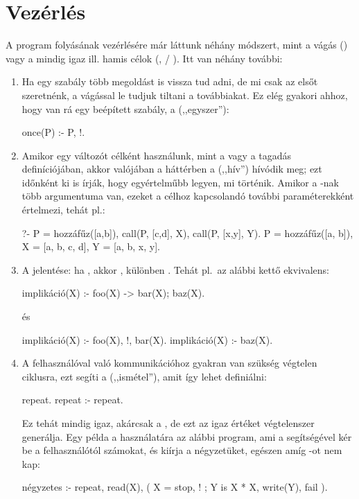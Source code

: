 \section{Vezérlés}
A program folyásának vezérlésére már láttunk néhány
módszert, mint a vágás (\pr{!}) vagy a mindig igaz
ill. hamis célok (,  /
). Itt van néhány további:
\begin{enumerate}
\item Ha egy szabály több megoldást is vissza tud
  adni, de mi csak az elsőt szeretnénk, a vágással
  le tudjuk tiltani a továbbiakat. Ez elég gyakori
  ahhoz, hogy van rá egy beépített szabály, a
   (,,egyszer''):
\begin{program}
once(P) :- P, !.
\end{program}
\item Amikor egy  változót célként használunk,
  mint a  vagy a tagadás definíciójában,
  akkor valójában a háttérben a 
  (,,hív'') hívódik meg; ezt időnként ki is írják,
  hogy egyértelműbb legyen, mi történik. Amikor a
  -nak több argumentuma van, ezeket a
  célhoz kapcsolandó további paraméterekként
  értelmezi, tehát pl.:
\begin{query}
?- P = hozzáfűz([a,b]),
   call(P, [c,d], X),
   call(P, [x,y], Y).
P = hozzáfűz([a, b]),
X = [a, b, c, d],
Y = [a, b, x, y].
\end{query}
\item A  jelentése: ha , akkor
  , különben . Tehát pl.~az alábbi kettő
  ekvivalens:
\index{\pr{->}}
\begin{program}
implikáció(X) :- foo(X) -> bar(X); baz(X).
\end{program}   
és
\begin{program}
implikáció(X) :- foo(X), !, bar(X).
implikáció(X) :- baz(X).
\end{program}
\item A felhasználóval való kommunikációhoz gyakran
  van szükség végtelen ciklusra, ezt segíti a
   (,,ismétel''), amit így lehet
  definiálni:
\begin{program}  
repeat.
repeat :- repeat.
\end{program}
Ez tehát mindig igaz, akárcsak a , de ezt
az igaz értéket végtelenszer generálja. Egy példa a
használatára az alábbi program, ami a 
segítségével kér be a felhasználótól számokat, és
kiírja a négyzetüket, egészen amíg -ot nem
kap:
\begin{program}
négyzetes :-
    repeat, read(X),
    ( X = stop, !
    ; Y is X * X, write(Y), fail
    ).
\end{program}
\end{enumerate}

